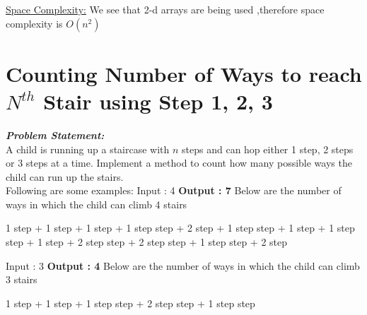 \documentclass[12pt]{book}
\begin{document}
\underline{Space Complexity:}\newline
We see that 2-d arrays are being used ,therefore space complexity is $O(n^2)$\\
	
\chapter{Counting Number of Ways to reach $N^{th}$ Stair using Step 1, 2, 3}

\textbf{\textit{Problem Statement:}}\\

A child is running up a staircase with $n$ steps and can hop either 1 step, 2 steps or 3 steps at a time. Implement a method to count how many possible ways the child can run up the stairs.\\

Following are some examples:\newline
Input : 4\newline 
\textbf{Output : 7}\newline
\newline
Below are the number of ways in which the child can climb 4 stairs\newline
\begin{center}
1 step + 1 step + 1 step + 1 step step + 2 step + 1 step step + 1 step + 1 step step + 1 step + 2 step step + 2 step step + 1 step step + 2 step\newline
\end{center}

Input : 3\newline 
\textbf{Output : 4}\newline
\newline
Below are the number of ways in which the child can climb 3 stairs\newline
\begin{center}
1 step + 1 step + 1 step step + 2 step step + 1 step step\newline
\end{center}
\end{document}
